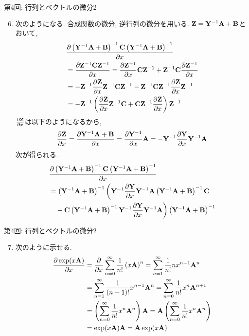 \documentclass[dvipdfmx,notheorems,t]{beamer}
\begin{document}
\begin{frame}{第4回: 行列とベクトルの微分2}
\begin{enumerate}
  \setcounter{enumi}{5}
  \item 次のようになる. 合成関数の微分, 逆行列の微分を用いる.
  $\vb{Z} = \vb{Y}^{-1} \vb{A} + \vb{B}$とおいて,
  \begin{align*}
    & \pdv{\left( \vb{Y}^{-1} \vb{A} + \vb{B} \right)^{-1}
      \vb{C} \left( \vb{Y}^{-1} \vb{A} + \vb{B} \right)^{-1}}{x} \\
      &= \pdv{\vb{Z}^{-1} \vb{C} \vb{Z}^{-1}}{x}
      = \pdv{\vb{Z}^{-1}}{x} \vb{C} \vb{Z}^{-1} + \vb{Z}^{-1} \vb{C} \pdv{\vb{Z}^{-1}}{x} \\
      &= -\vb{Z}^{-1} \pdv{\vb{Z}}{x} \vb{Z}^{-1} \vb{C} \vb{Z}^{-1}
        - \vb{Z}^{-1} \vb{C} \vb{Z}^{-1} \pdv{\vb{Z}}{x} \vb{Z}^{-1} \\
      &= -\vb{Z}^{-1} \left( \pdv{\vb{Z}}{x} \vb{Z}^{-1} \vb{C} + \vb{C} \vb{Z}^{-1} \pdv{\vb{Z}}{x} \right) \vb{Z}^{-1}
  \end{align*}
  $\pdv{\vb{Z}}{x}$は以下のようになるから,
  \begin{align*}
    \pdv{\vb{Z}}{x} = \pdv{\vb{Y}^{-1} \vb{A} + \vb{B}}{x}
      = \pdv{\vb{Y}^{-1}}{x} \vb{A}
      = -\vb{Y}^{-1} \pdv{\vb{Y}}{x} \vb{Y}^{-1} \vb{A}
  \end{align*}
  次が得られる.
  \begin{align*}
    & \pdv{\left( \vb{Y}^{-1} \vb{A} + \vb{B} \right)^{-1}
      \vb{C} \left( \vb{Y}^{-1} \vb{A} + \vb{B} \right)^{-1}}{x} \\
    &= \left( \vb{Y}^{-1} \vb{A} + \vb{B} \right)^{-1}
      \bigg( \vb{Y}^{-1} \pdv{\vb{Y}}{x} \vb{Y}^{-1} \vb{A}
      \left( \vb{Y}^{-1} \vb{A} + \vb{B} \right)^{-1} \vb{C} \\
      & \quad + \vb{C} \left( \vb{Y}^{-1} \vb{A} + \vb{B} \right)^{-1}
      \vb{Y}^{-1} \pdv{\vb{Y}}{x} \vb{Y}^{-1} \vb{A} \bigg)
      \left( \vb{Y}^{-1} \vb{A} + \vb{B} \right)^{-1}
  \end{align*}
\end{enumerate}
\end{frame}

\begin{frame}{第4回: 行列とベクトルの微分2}
\begin{enumerate}
  \setcounter{enumi}{6}
  \item 次のように示せる.
  \begin{align*}
    \pdv{\exp(x \vb{A})}{x} &= \pdv{x} \sum_{n = 0}^\infty \frac{1}{n!} \left( x \vb{A} \right)^n
      = \sum_{n = 1}^\infty \frac{1}{n!} n x^{n - 1} \vb{A}^n \\
      &= \sum_{n = 1}^\infty \frac{1}{(n - 1)!} x^{n - 1} \vb{A}^n
      = \sum_{n = 0}^\infty \frac{1}{n!} x^n \vb{A}^{n + 1} \\
      &= \left( \sum_{n = 0}^\infty \frac{1}{n!} x^n \vb{A}^n \right) \vb{A}
      = \vb{A} \left( \sum_{n = 0}^\infty \frac{1}{n!} x^n \vb{A}^n \right) \\
      &= \exp(x \vb{A}) \vb{A} = \vb{A} \exp(x \vb{A})
  \end{align*}
\end{enumerate}
\end{frame}
\end{document}
